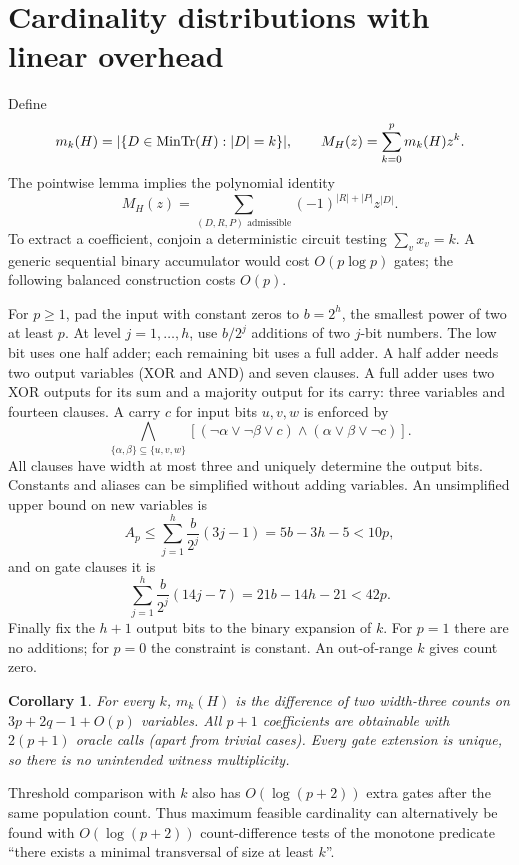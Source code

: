 \documentclass[11pt]{article}
\newtheorem{corollary}[theorem]{Corollary}
\theoremstyle{remark}\newtheorem{remark}[theorem]{Remark}
\newcommand{\MT}{\mathop{\rm MinTr}}
\begin{document}
\section{Cardinality distributions with linear overhead}\label{sec:size}
Define
\[
 m_k(H)=|\{D\in\MT(H):|D|=k\}|,\qquad
 M_H(z)=\sum_{k=0}^p m_k(H)z^k.
\]
The pointwise lemma implies the polynomial identity
\[
 M_H(z)=\sum_{(D,R,P)\text{ admissible}}(-1)^{|R|+|P|}z^{|D|}.
\]
To extract a coefficient, conjoin a deterministic circuit testing
$\sum_v x_v=k$. A generic sequential binary accumulator would cost
$O(p\log p)$ gates; the following balanced construction costs $O(p)$.

For $p\ge1$, pad the input with constant zeros to $b=2^h$, the smallest power
of two at least $p$. At level $j=1,\ldots,h$, use $b/2^j$ additions of two
$j$-bit numbers. The low bit uses one half adder; each remaining bit uses a
full adder. A half adder needs two output variables (XOR and AND) and seven
clauses. A full adder uses two XOR outputs for its sum and a majority output
for its carry: three variables and fourteen clauses. A carry $c$ for input
bits $u,v,w$ is enforced by
\[
 \bigwedge_{\{\alpha,\beta\}\subseteq\{u,v,w\}}
 [ (\neg\alpha\vee\neg\beta\vee c)
   \wedge(\alpha\vee\beta\vee\neg c) ].
\]
All clauses have width at most three and uniquely determine the output bits.
Constants and aliases can be simplified without adding variables. An
unsimplified upper bound on new variables is
\begin{equation}\label{eq:adder}
 A_p\le\sum_{j=1}^h\frac b{2^j}(3j-1)
 =5b-3h-5<10p,
\end{equation}
and on gate clauses it is
\[
 \sum_{j=1}^h\frac b{2^j}(14j-7)=21b-14h-21<42p.
\]
Finally fix the $h+1$ output bits to the binary expansion of $k$. For $p=1$
there are no additions; for $p=0$ the constraint is constant. An out-of-range
$k$ gives count zero.

\begin{corollary}\label{cor:size}
For every $k$, $m_k(H)$ is the difference of two width-three counts on
$3p+2q-1+O(p)$ variables. All $p+1$ coefficients are obtainable with
$2(p+1)$ oracle calls (apart from trivial cases). Every gate extension is
unique, so there is no unintended witness multiplicity.
\end{corollary}

Threshold comparison with $k$ also has $O(\log(p+2))$ extra gates after the
same population count. Thus maximum feasible cardinality can alternatively
be found with $O(\log(p+2))$ count-difference tests of the monotone predicate
``there exists a minimal transversal of size at least $k$''.
\end{document}
